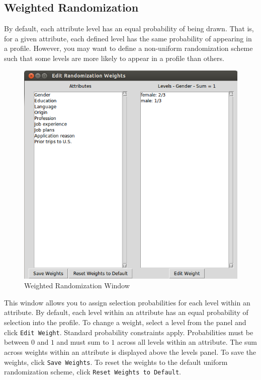 \documentclass[12pt]{article}
\begin{document}
\subsection{Weighted Randomization}

By default, each attribute level has an equal probability of being drawn. That is, for a given attribute, each defined level has the same probability of appearing in a profile. However, you may want to define a non-uniform randomization scheme such that some levels are more likely to appear in a 
profile than others. 

\begin{figure}[ht!]
\centering\includegraphics[scale=.6]{graphics/weight_screen.png}
\caption{Weighted Randomization Window}
\end{figure}

This window allows you to assign selection probabilities for each level within an attribute. By default, each level within an attribute has an equal probability of selection into the profile. To change a weight, select a level from the panel and click \texttt{Edit Weight}. Standard probability constraints apply. Probabilities must be between $0$ and $1$ and must sum to $1$ across all levels within an attribute. The sum across weights within an attribute is displayed above the levels panel. To save the weights, click \texttt{Save Weights}. To reset the weights to the default uniform randomization scheme, click \texttt{Reset Weights to Default}.
\end{document}

